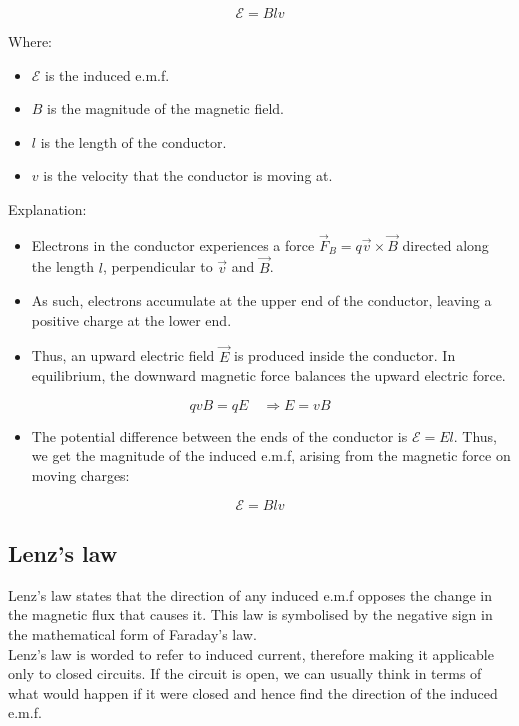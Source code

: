 \documentclass[11pt]{article}
\begin{document}
\[\mathcal{E} = Blv\]

Where:
\begin{itemize}
\item \(\mathcal{E}\) is the induced e.m.f.
\item \(B\) is the magnitude of the magnetic field.
\item \(l\) is the length of the conductor.
\item \(v\) is the velocity that the conductor is moving at.
\end{itemize}
Explanation:
\begin{itemize}
\item Electrons in the conductor experiences a force \(\vec{F}_B = q \vec{v} \times \vec{B}\) directed along the length \(l\), perpendicular to \(\vec{v}\) and \(\vec{B}\).
\item As such, electrons accumulate at the upper end of the conductor, leaving a positive charge at the lower end.
\item Thus, an upward electric field \(\vec{E}\) is produced inside the conductor. In equilibrium, the downward magnetic force balances the upward electric force.
\end{itemize}
\[qvB = qE \quad \Rightarrow E = vB\]
\begin{itemize}
\item The potential difference between the ends of the conductor is \(\mathcal{E} = El\). Thus, we get the magnitude of the induced e.m.f, arising from the magnetic force on moving charges:
\end{itemize}
\[\mathcal{E} = Blv\]

\newpage

\subsection{Lenz's law}
\label{sec:org1e9ef01}
Lenz's law states that the direction of any induced e.m.f opposes the change in the magnetic flux that causes it. This law is symbolised by the negative sign in the mathematical form of Faraday's law.
\\[0pt]

Lenz's law is worded to refer to induced current, therefore making it applicable only to closed circuits. If the circuit is open, we can usually think in terms of what would happen if it were closed and hence find the direction of the induced e.m.f.
\end{document}
